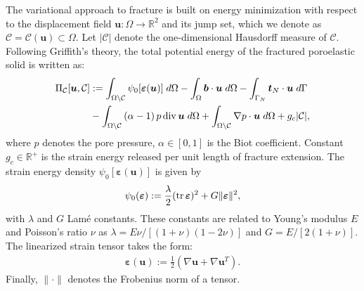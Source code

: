 The variational approach to fracture is built on energy minimization with respect to the displacement field $\bm{u}:\Omega\rightarrow\mathbb{R}^2$ and its jump set, which we denote as $\mathcal{C}=\mathcal{C}(\bm{u})\subset\Omega$. Let $|\mathcal{C}|$ denote the one-dimensional Hausdorff measure of $\mathcal{C}$. Following Griffith's theory, the total potential energy of the fractured poroelastic solid is written as:
\begin{equation}\label{Eq:Pi}
    \begin{aligned}
        \Pi_{\mathcal{C}}[\bm{u},\mathcal{C}] &:= \int_{\Omega\setminus\mathcal{C}} \psi_0[\bm{\varepsilon}(\bm{u})] \; d\Omega
	    - \int_{\Omega} \bm{b} \cdot \bm{u} \; d\Omega
	    - \int_{\Gamma_N} \bm{t}_N\cdot \bm{u} \; d\Gamma \\
	    &- \int_{\Omega\setminus\mathcal{C}} \left(\alpha - 1\right)p\operatorname{div}\bm{u}\; d\Omega + 
	    \int_{\Omega\setminus\mathcal{C}}\nabla p\cdot \bm{u}\; d\Omega + g_c|\mathcal{C}|,\\
    \end{aligned}
\end{equation}
where $p$ denotes the pore pressure, $\alpha\in[0,1]$ is the Biot coefficient. {Constant} $g_c\in\mathbb{R}^+$ is the strain energy released per unit length of fracture extension. {The strain energy density $\psi_0[\bm{\varepsilon}(\bm{u})]$ is given by}
\begin{equation*}%
    \begin{aligned}
        \psi_0(\bm{\varepsilon}) := \frac{\lambda}{2} (\trace \bm{\varepsilon})^2 + G \|\bm{\varepsilon}\|^2,
    \end{aligned}
\end{equation*}
with $\lambda$ and $G$ Lam\'e constants. These constants are related to Young's modulus $E$ and Poisson's ratio $\nu$ as $\lambda=E\nu/[(1+\nu)(1-2\nu)]$ and $G=E/[2(1+\nu)]$.
The linearized strain tensor takes the form:
\begin{equation*}
    \begin{aligned}
        \bm{\varepsilon}(\bm{u}) := 
        \frac{1}{2}\left(\nabla\bm{u}+\nabla\bm{u}^T\right).
    \end{aligned}
\end{equation*}
Finally, $\|\cdot\|$ denotes the Frobenius norm of a tensor.


